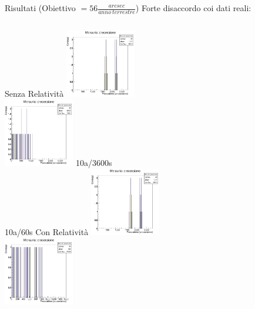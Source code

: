     \begin{frame}{Risultati (Obiettivo $= 56 \frac{arcsec}{anno\ terrestre}$)}
        Forte disaccordo coi dati reali:
        \vspace{3mm}
        \begin{columns}
                \centering
                Senza Relatività
                \includegraphics[width=\textwidth, height=3cm]{9_prec/sballati/10_3600_nor_1.jpg}\\
                \includegraphics[width=\textwidth, height=3cm]{9_prec/sballati/10_60_nor_1.jpg}
                \centering
                10a/3600s\\
                \vspace{3cm}
                10a/60s
                \centering
                Con Relatività
                \includegraphics[width=.9\textwidth, height=3cm]{9_prec/sballati/10_3600_rel_1.jpg}\\
                \includegraphics[width=.9\textwidth, height=3cm]{9_prec/sballati/10_60_rel_1.jpg}
        \end{columns}
    \end{frame}
